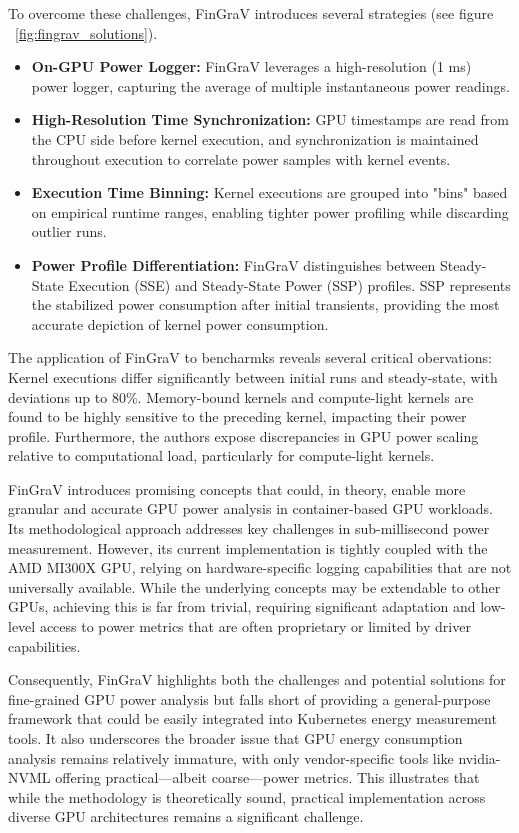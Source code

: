 To overcome these challenges, FinGraV introduces several strategies (see figure ~\ref{fig:fingrav_solutions}). 
\begin{itemize}
    \item \textbf{On-GPU Power Logger:} FinGraV leverages a high-resolution (1 ms) power logger, capturing the average of multiple instantaneous power readings.
    \item \textbf{High-Resolution Time Synchronization:} GPU timestamps are read from the CPU side before kernel execution, and synchronization is maintained throughout execution to correlate power samples with kernel events.    
    \item \textbf{Execution Time Binning:} Kernel executions are grouped into "bins" based on empirical runtime ranges, enabling tighter power profiling while discarding outlier runs.    
    \item \textbf{Power Profile Differentiation:} FinGraV distinguishes between Steady-State Execution (SSE) and Steady-State Power (SSP) profiles. SSP represents the stabilized power consumption after initial transients, providing the most accurate depiction of kernel power consumption.
\end{itemize}
The application of FinGraV to bencharmks reveals several critical obervations: Kernel executions differ significantly between initial runs and steady-state, with deviations up to 80\%. Memory-bound kernels and compute-light kernels are found to be highly sensitive to the preceding kernel, impacting their power profile. Furthermore, the authors expose discrepancies in GPU power scaling relative to computational load, particularly for compute-light kernels.

FinGraV introduces promising concepts that could, in theory, enable more granular and accurate GPU power analysis in container-based GPU workloads. Its methodological approach addresses key challenges in sub-millisecond power measurement. However, its current implementation is tightly coupled with the AMD MI300X GPU, relying on hardware-specific logging capabilities that are not universally available. While the underlying concepts may be extendable to other GPUs, achieving this is far from trivial, requiring significant adaptation and low-level access to power metrics that are often proprietary or limited by driver capabilities.

Consequently, FinGraV highlights both the challenges and potential solutions for fine-grained GPU power analysis but falls short of providing a general-purpose framework that could be easily integrated into Kubernetes energy measurement tools. It also underscores the broader issue that GPU energy consumption analysis remains relatively immature, with only vendor-specific tools like nvidia-NVML offering practical—albeit coarse—power metrics. This illustrates that while the methodology is theoretically sound, practical implementation across diverse GPU architectures remains a significant challenge.

